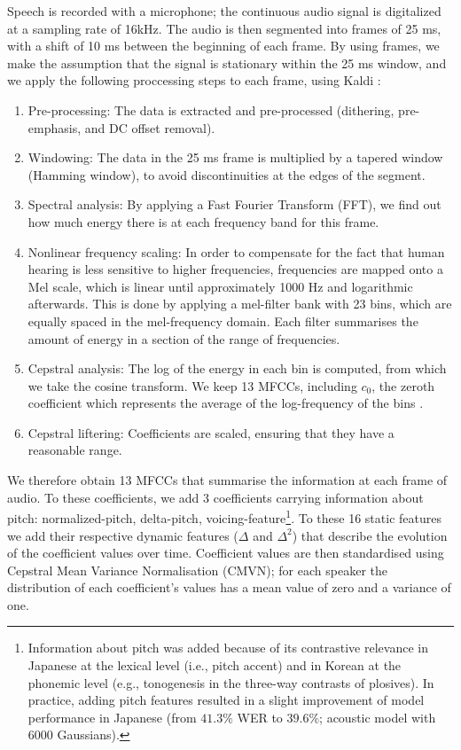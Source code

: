 Speech is recorded with a microphone; the continuous audio signal is digitalized at a sampling rate of 16kHz.
The audio is then segmented into frames of 25 ms, with a shift of 10 ms between the beginning of each frame. By using frames, we make the assumption that the signal is stationary within the 25 ms window, and we apply the following proccessing steps to each frame, using Kaldi \cite{povey2011}:

\begin{enumerate}
\item Pre-processing: The data is extracted and pre-processed (dithering, pre-emphasis, and DC offset removal).
\item Windowing: The data in the 25 ms frame is multiplied by a tapered window (Hamming window), to avoid discontinuities at the edges of the segment.
\item Spectral analysis: By applying a Fast Fourier Transform (FFT), we find out how much energy there is at each frequency band for this frame.
\item Nonlinear frequency scaling: In order to compensate for the fact that human hearing is less sensitive to higher frequencies, frequencies are mapped onto a Mel scale, which is linear until approximately 1000 Hz and logarithmic afterwards. This is done by applying a mel-filter bank with 23 bins, which are equally spaced in the mel-frequency domain. Each filter summarises the amount of energy in a section of the range of frequencies. 
\item Cepstral analysis: The log of the energy in each bin is computed, from which we take the cosine transform. We keep 13 MFCCs, including $c_{0}$, the zeroth coefficient which represents the average of the log-frequency of the bins \cite{gales2008}.
  \item Cepstral liftering: Coefficients are scaled, ensuring that they have a reasonable range.
\end{enumerate}

We therefore obtain 13 MFCCs that summarise the information at each frame of audio. To these coefficients, we add 3 coefficients carrying information about pitch: normalized-pitch, delta-pitch, voicing-feature\footnote{Information about pitch was added because of its contrastive relevance in Japanese at the lexical level (i.e., pitch accent) and in Korean at the phonemic level (e.g., tonogenesis in the three-way contrasts of plosives). In practice, adding pitch features resulted in a slight improvement of model performance in Japanese (from $41.3\%$ WER to $39.6\%$; acoustic model with 6000 Gaussians).}.
To these 16 static features we add their respective dynamic features ($\Delta$ and $\Delta^2$) that describe the evolution of the coefficient values over time. 
Coefficient values are then standardised using Cepstral Mean Variance Normalisation (CMVN); for each speaker the distribution of each coefficient's values has a mean value of zero and a variance of one. 

